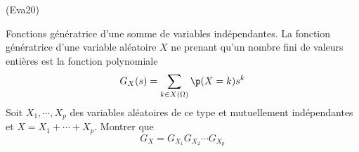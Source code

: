 \begin{tiny}(Eva20)\end{tiny} Fonctions génératrice d'une somme de variables indépendantes.\newline
La fonction génératrice d'une variable aléatoire $X$ ne prenant qu'un nombre fini de valeurs entières est la fonction polynomiale
\begin{displaymath}
  G_X(s) = \sum_{k\in X(\Omega)}\p(X=k)s^k
\end{displaymath}
Soit $X_1,\cdots,X_p$ des variables aléatoires de ce type et mutuellement indépendantes et $X = X_1+\cdots+X_p$. Montrer que
\begin{displaymath}
  G_X = G_{X_1}G_{X_2}\cdots G_{X_p}
\end{displaymath}
